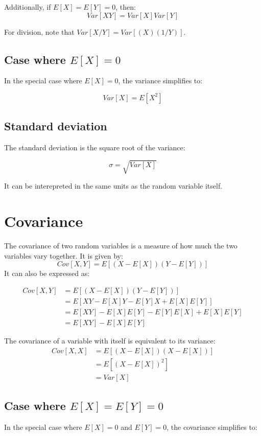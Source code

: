 \documentclass[12pt]{article}
\begin{document}
Additionally, if $E[X] = E[Y] = 0$, then:
$$ Var[X Y] = Var[X] Var[Y] $$

For division, note that $Var[X / Y] = Var[(X) (1 / Y)] $.

\subsection{\texorpdfstring{Case where $E[X] = 0$}{Case where E[X] = 0}}
In the special case where $E[X] = 0$, the variance simplifies to:

$$ Var[X] = E[X^2] $$

\subsection{Standard deviation}

The standard deviation is the square root of the variance:

$$ \sigma = \sqrt{Var[X]} $$

It can be interepreted in the same units as the random variable itself.

\section{Covariance}
The covariance of two random variables is a measure of how much the two variables vary together.
It is given by:
$$ Cov[X,Y] = E[(X - E[X])(Y - E[Y])] $$
It can also be expressed as:

\begin{align*}
    Cov[X,Y] &= E[(X - E[X])(Y - E[Y])] \\
    &= E[XY - E[X]Y - E[Y]X + E[X]E[Y]] \\
    &= E[XY] - E[X]E[Y] - E[Y]E[X] + E[X]E[Y] \\
    &= E[XY] - E[X]E[Y]
\end{align*}

The covariance of a variable with itself is equivalent to its variance:
\begin{align*}
    Cov[X,X] &= E[(X - E[X])(X - E[X])] \\
    &= E[(X - E[X])^2] \\
    &= Var[X]
\end{align*}

\subsection{\texorpdfstring{Case where $E[X] = E[Y] = 0$}{Case where E[X] = E[Y] = 0}}
In the special case where $E[X] = 0$ and $E[Y] = 0$, the covariance simplifies to:
\end{document}
